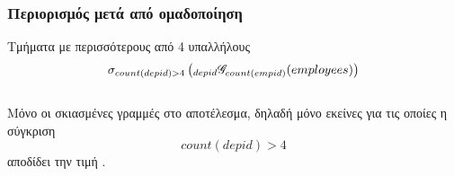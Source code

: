 \begin{frame}
\frametitle{Περιορισμός μετά από ομαδοποίηση}
\begin{minipage}{\wE}
  \begin{exampleblock}{Τμήματα με περισσότερους από 4 υπαλλήλους}
    \[  
      \sigma _{count(depid) >4} 
      \left(
        {}_{depid}  \mathscr{G}_{count(empid)}  (employees)  
      \right)
   \]
  \end{exampleblock}
  \begin{columns}[T]
    \begin{column}{0.5\textwidth}
      Μόνο οι σκιασμένες γραμμές στο αποτέλεσμα, δηλαδή μόνο εκείνες για τις οποίες 
      η σύγκριση 
      \[ count(depid) > 4 \]
      αποδίδει την τιμή {\sq \ttrue}.
    \end{column}
  \end{columns} 
\end{minipage}
\end{frame}


